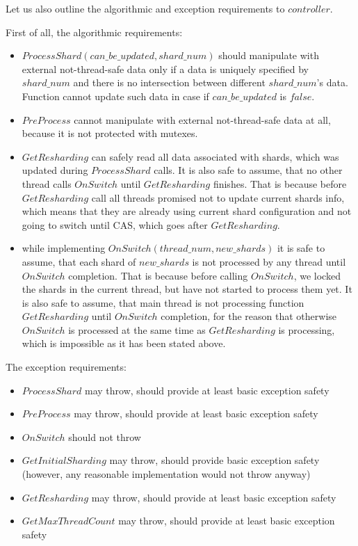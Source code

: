 \documentclass{article}
\begin{document}
Let us also outline the algorithmic and exception requirements to $controller$.

First of all, the algorithmic requirements:
\begin{itemize}
	\item $ProcessShard(can\_be\_updated, shard\_num)$ should manipulate with external not-thread-safe data only if a data is uniquely specified by $shard\_num$ and there is no intersection between different $shard\_num$'s data. Function cannot update such data in case if $can\_be\_updated$ is $false$.
	\item $PreProcess$ cannot manipulate with external not-thread-safe data at all, because it is not protected with mutexes.
	\item $GetResharding$ can safely read all data associated with shards, which was updated during $ProcessShard$ calls. It is also safe to assume, that no other thread calls $OnSwitch$ until $GetResharding$ finishes. That is because before $GetResharding$ call all threads promised not to update current shards info, which means that they are already using current shard configuration and not going to switch until CAS, which goes after $GetResharding$.
	\item while implementing $OnSwitch(thread\_num, new\_shards)$ it is safe to assume, that each shard of $new\_shards$ is not processed by any thread until $OnSwitch$ completion. That is because before calling $OnSwitch$, we locked the shards in the current thread, but have not started to process them yet. It is also safe to assume, that main thread is not processing function $GetResharding$ until $OnSwitch$ completion, for the reason that otherwise $OnSwitch$ is processed at the same time as $GetResharding$ is processing, which is impossible as it has been stated above.
\end{itemize}

The exception requirements:
\begin{itemize}
	\item $ProcessShard$ may throw, should provide at least basic exception safety
	\item $PreProcess$ may throw, should provide at least basic exception safety
	\item $OnSwitch$ should not throw
	\item $GetInitialSharding$ may throw, should provide basic exception safety (however, any reasonable implementation would not throw anyway)
	\item $GetResharding$ may throw, should provide at least basic exception safety
	\item $GetMaxThreadCount$ may throw, should provide at least basic exception safety
\end{itemize}
\end{document}
